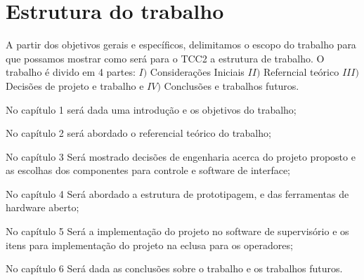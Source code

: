 \section{Estrutura do trabalho}

A partir dos objetivos gerais e específicos, delimitamos o escopo do trabalho para que possamos mostrar como será para o TCC2 a estrutura de trabalho. O trabalho é divido em 4 partes: $I)$ Considerações Iniciais $II)$  Referncial teórico $III)$ Decisões de projeto e trabalho e $IV)$ Conclusões e trabalhos futuros.



No capítulo 1 será dada uma introdução e os objetivos do trabalho;

No capítulo 2 será abordado o referencial teórico do trabalho;

No capítulo 3 Será mostrado decisões de engenharia acerca do projeto proposto e as escolhas dos componentes para controle e software de interface;

No capítulo 4 Será abordado a estrutura de prototipagem, e das ferramentas de hardware aberto;

No capítulo 5 Será a implementação do projeto no software de supervisório e os itens para implementação do projeto na eclusa para os operadores;

No capítulo 6  Será dada as conclusões sobre o trabalho e os trabalhos futuros.

